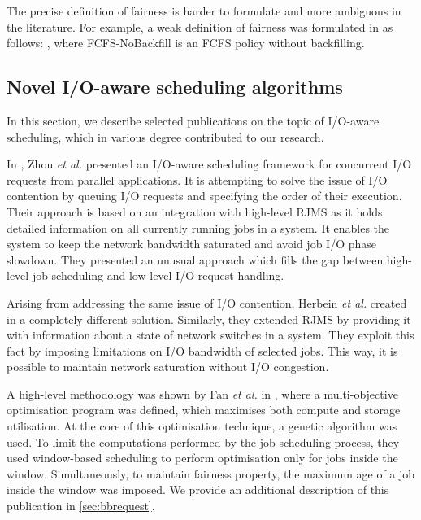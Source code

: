\documentclass[thesis-en.tex]{subfiles}
\begin{document}
The precise definition of fairness is harder to formulate and more ambiguous in the literature. For example, a weak definition of fairness was formulated in \cite{srinivasan2002selective} as follows: , where FCFS-NoBackfill is an FCFS policy without backfilling.

\subsection{Novel I/O-aware scheduling algorithms}
In this section, we describe selected publications on the topic of I/O-aware scheduling, which in various degree contributed to our research.

In \cite{7307592}, Zhou \textit{et al.} presented an I/O-aware scheduling framework for concurrent I/O requests from parallel applications. It is attempting to solve the issue of I/O contention by queuing I/O requests and specifying the order of their execution. Their approach is based on an integration with high-level RJMS as it holds detailed information on all currently running jobs in a system. It enables the system to keep the network bandwidth saturated and avoid job I/O phase slowdown. They presented an unusual approach which fills the gap between high-level job scheduling and low-level I/O request handling.

Arising from addressing the same issue of I/O contention, Herbein \textit{et al.} created in \cite{10.1145/2907294.2907316} a completely different solution. Similarly, they extended RJMS by providing it with information about a state of network switches in a system. They exploit this fact by imposing limitations on I/O bandwidth of selected jobs. This way, it is possible to maintain network saturation without I/O congestion.

A high-level methodology was shown by Fan \textit{et al.} in \cite{10.1145/3307681.3325401}, where a multi-objective optimisation program was defined, which maximises both compute and storage utilisation. At the core of this optimisation technique, a genetic algorithm was used. To limit the computations performed by the job scheduling process, they used window-based scheduling to perform optimisation only for jobs inside the window. Simultaneously, to maintain fairness property, the maximum age of a job inside the window was imposed. We provide an additional description of this publication in \autoref{sec:bbrequest}.
\end{document}
